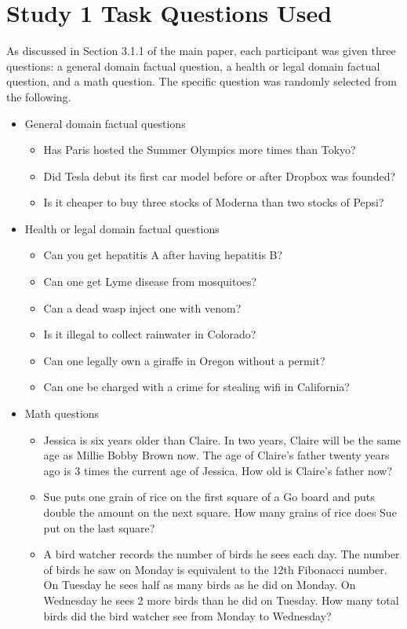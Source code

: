 \section{Study 1 Task Questions Used}
\label{app:study1questions}

As discussed in Section 3.1.1 of the main paper, each participant was given three questions: a general domain factual question, a health or legal domain factual question, and a math question. The specific question was randomly selected from the following.

\begin{itemize}
    \item General domain factual questions
    \begin{itemize}
        \item Has Paris hosted the Summer Olympics more times than Tokyo?
        \item Did Tesla debut its first car model before or after Dropbox was founded?
        \item Is it cheaper to buy three stocks of Moderna than two stocks of Pepsi?
    \end{itemize}
    \item Health or legal domain factual questions
    \begin{itemize}
        \item Can you get hepatitis A after having hepatitis B?
        \item Can one get Lyme disease from mosquitoes?
        \item Can a dead wasp inject one with venom?
        \item Is it illegal to collect rainwater in Colorado?
        \item Can one legally own a giraffe in Oregon without a permit?
        \item Can one be charged with a crime for stealing wifi in California?
     \end{itemize}
    \item Math questions
    \begin{itemize}
        \item Jessica is six years older than Claire. In two years, Claire will be the same age as Millie Bobby Brown now. The age of Claire's father twenty years ago is 3 times the current age of Jessica. How old is Claire’s father now?
        \item Sue puts one grain of rice on the first square of a Go board and puts double the amount on the next square. How many grains of rice does Sue put on the last square?
        \item A bird watcher records the number of birds he sees each day. The number of birds he saw on Monday is equivalent to the 12th Fibonacci number. On Tuesday he sees half as many birds as he did on Monday. On Wednesday he sees 2 more birds than he did on Tuesday. How many total birds did the bird watcher see from Monday to Wednesday?
    \end{itemize}
\end{itemize}



